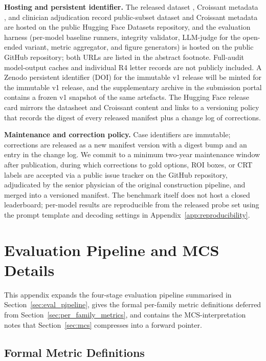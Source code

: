 \documentclass{article}
\providecommand{\DIFaddtex}[1]{{\protect\color{blue} \sf #1}} %
\providecommand{\DIFdeltex}[1]{{\protect\color{red} \scriptsize #1}} %
\providecommand{\DIFaddbegin}{} %
\providecommand{\DIFaddend}{} %
\providecommand{\DIFdelbegin}{} %
\providecommand{\DIFdelend}{} %
\providecommand{\DIFadd}[1]{\texorpdfstring{\DIFaddtex{#1}}{#1}} %
\providecommand{\DIFdel}[1]{\texorpdfstring{\DIFdeltex{#1}}{}} %
\begin{document}
\textbf{Hosting and persistent identifier.} The \DIFdelbegin \DIFdel{released dataset , Croissant metadata , and clinician adjudication record }\DIFdelend \DIFaddbegin \DIFadd{public-subset dataset and Croissant metadata }\DIFaddend are hosted on the public Hugging Face Datasets repository, and the evaluation harness (per-model baseline runners, integrity validator, LLM-judge for the open-ended variant, metric aggregator, and figure generators) is hosted on the public GitHub repository; both URLs are listed in the abstract footnote. \DIFaddbegin \DIFadd{Full-audit model-output caches and individual R4 letter records are not publicly included. }\DIFaddend A Zenodo persistent identifier (DOI) for the immutable v1 release will be minted for the immutable v1 release, and the supplementary archive in the submission portal contains a frozen v1 snapshot of the same artefacts. The Hugging Face release card mirrors the datasheet and Croissant content and links to a versioning policy that records the digest of every released manifest plus a change log of corrections.

\textbf{Maintenance and correction policy.} Case identifiers are immutable; corrections are released as a new manifest version with a digest bump and an entry in the change log. We commit to a minimum two-year maintenance window after publication, during which corrections to gold options, ROI boxes, or CRT labels are accepted via a public issue tracker on the GitHub repository, adjudicated by the senior physician of the original construction pipeline, and merged into a versioned manifest. The benchmark itself does not host a closed leaderboard; per-model results are reproducible from the released probe set using the prompt template and decoding settings in Appendix~\ref{app:reproducibility}.

\section{Evaluation Pipeline and MCS Details}
\label{app:eval_pipeline_detail}

This appendix expands the four-stage evaluation pipeline summarised in Section~\ref{sec:eval_pipeline}, gives the formal per-family metric definitions deferred from Section~\ref{sec:per_family_metrics}, and contains the MCS-interpretation notes that Section~\ref{sec:mcs} compresses into a forward pointer.

\subsection{Formal Metric Definitions}
\label{app:metric_formulas}
\end{document}
